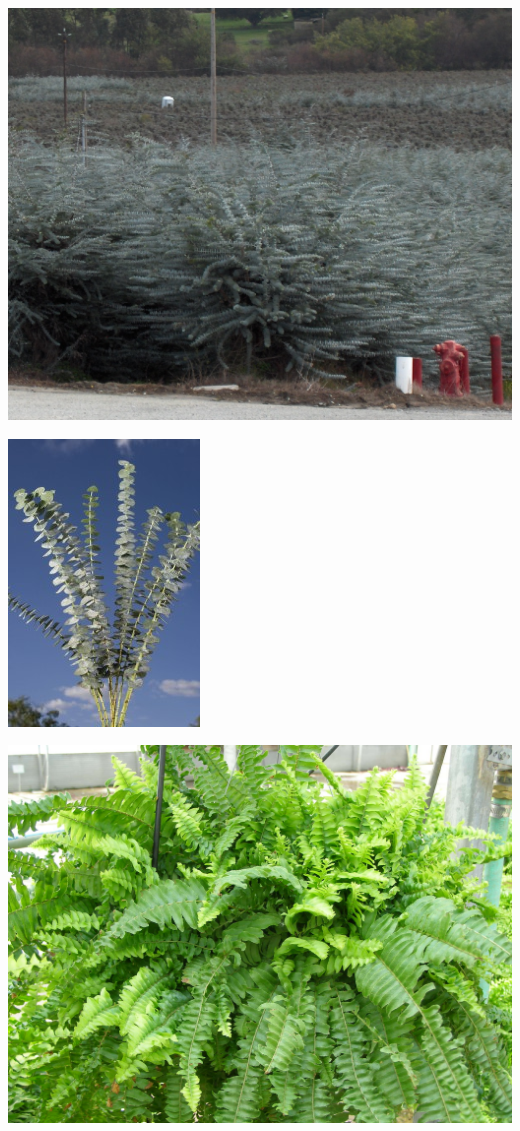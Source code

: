 \documentclass{article}
\begin{document}
\begin{center}
\includegraphics[height=0.9\textheight, angle=90]{../Eucalyptus_Field.jpg}
\end{center}
\newpage

\begin{center}
\includegraphics[height=0.9\textheight, angle=90]{../Euclyptus.jpg}
\end{center}
\newpage

\begin{center}
\includegraphics[height=0.9\textheight, angle=90]{../Fern_Boston.jpg}
\end{center}
\newpage
\end{document}
